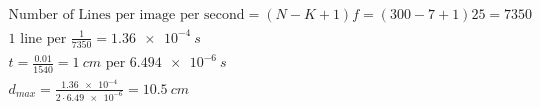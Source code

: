 \begin{equation}
    \begin{split}
        \text{Number of Lines per image per second} = (N - K + 1)f = (300 - 7 + 1)25 = 7350  \\
        \text{1 line per } \frac{1}{7350} = \SI{1.36e-4}{s} \\
        t = \frac{0.01}{1540} = \SI{1}{cm} \text{ per }\SI{6.494e-6}{s} \\
        d_{max} = \frac{\num{1.36e-4}}{2\cdot \num{6.49e-6}} = \SI{10.5}{cm}
    \end{split}
\end{equation}